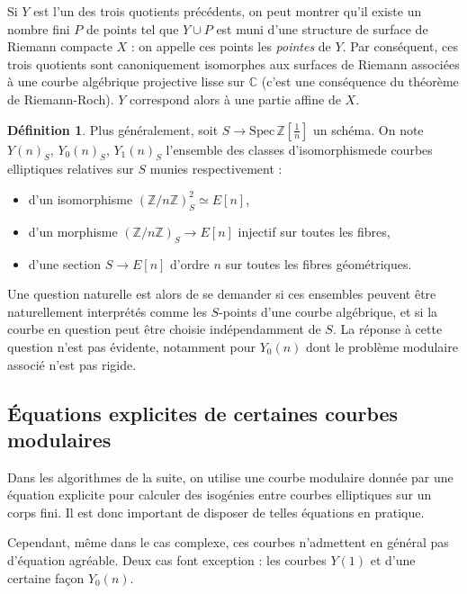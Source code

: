 \documentclass[11pt,a4paper]{article}
\newcommand{\Z}{\mathbb{Z}}
\newcommand{\C}{\mathbb{C}}
\newcommand{\vers}{\rightarrow}
\newcommand{\Spec}{\mathrm{Spec}\,}
\theoremstyle{definition}
\newtheorem{defi}[thm]{Définition}
\begin{document}
Si $Y$ est l'un des trois quotients précédents, on peut montrer qu'il existe un nombre fini $P$ de points tel que $Y\cup P$ est muni d'une structure de surface de Riemann compacte $X$ : on appelle ces points les \emph{pointes} de $Y$. Par conséquent, ces trois quotients sont canoniquement isomorphes aux surfaces de Riemann associées à une courbe algébrique projective lisse sur $\C$ (c'est une conséquence du théorème de Riemann-Roch). $Y$ correspond alors à une partie affine de $X$.

\begin{defi}

Plus généralement, soit $S \vers \Spec\Z\left[\frac{1}{n}\right]$ un schéma. On note $Y(n)_S$, $Y_0(n)_S$, $Y_1(n)_S$ l'ensemble des \og classes d'isomorphisme\fg de courbes elliptiques relatives sur $S$ munies respectivement :

\begin{itemize}

\item d'un isomorphisme $(\Z/n\Z)^2_S\simeq E[n]$,
\item d'un morphisme $(\Z/n\Z)_S \vers E[n]$ injectif sur toutes les fibres,
\item d'une section $S\vers E[n]$ d'ordre $n$ sur toutes les fibres géométriques.

\end{itemize}

\end{defi}

Une question naturelle est alors de se demander si ces ensembles peuvent être naturellement interprétés comme les $S$-points d'une courbe algébrique, et si la courbe en question peut être choisie indépendamment de $S$. La réponse à cette question n'est pas évidente, notamment pour $Y_0(n)$ dont le problème modulaire associé n'est pas rigide.


\newpage

\subsection{\'Equations explicites de certaines courbes modulaires}


Dans les algorithmes de la suite, on utilise une courbe modulaire donnée par une équation explicite pour calculer des isogénies entre courbes elliptiques sur un corps fini. Il est donc important de disposer de telles équations en pratique.

Cependant, même dans le cas complexe, ces courbes n'admettent en général pas d'équation agréable. Deux cas font exception : les courbes $Y(1)$ et d'une certaine façon $Y_0(n)$.
\end{document}

